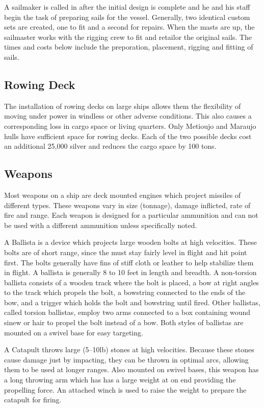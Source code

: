 A sailmaker is called in after the initial design is complete and he and his staff begin the task of preparing sails for the vessel. Generally, two identical custom sets are created, one to fit and a second for repairs. When the masts are up, the sailmaster works with the rigging crew to fit and retailor the original sails. The times and costs below include the preporation, placement, rigging and fitting of sails.


\subsection{Rowing Deck}
The installation of rowing decks on large ships allows them the flexibility of moving under power in windless or other adverse conditions. This also causes a corresponding loss in cargo space or living quarters. Only Metioujo and Maraujo hulls have sufficient space for rowing decks. Each of the two possible decks cost an additional 25,000 silver and reduces the cargo space by 100 tons.
\subsection{Weapons}
Most weapons on a ship are deck mounted engines which project missiles of different types. These weapons vary in size (tonnage), damage inflicted, rate of fire and range. Each weapon is designed for a particular ammunition and can not be used with a different ammunition unless specifically noted.

A Ballista is a device which projects large wooden bolts at high velocities. These bolts are of short range, since the must stay fairly level in flight and hit point first. The bolts generally have fins of stiff cloth or leather to help stabilize them in flight. A ballista is generally 8 to 10 feet in length and breadth. A non-torsion ballista consists of a wooden track where the bolt is placed, a bow at right angles to the track which propels the bolt, a bowstring connected to the ends of the bow, and a trigger which holds the bolt and bowstring until fired. Other ballistas, called torsion ballistas, employ two arms connected to a box containing wound sinew or hair to propel the bolt instead of a bow. Both styles of ballistas are mounted on a swivel base for easy targeting.

A Catapult throws large (5–10lb) stones at high velocities. Because these stones cause damage just by impacting, they can be thrown in optimal arcs, allowing them to be used at longer ranges. Also mounted on swivel bases,
this weapon has a long throwing arm which has has a large weight at on end providing the propelling force. An attached winch is used to raise the weight to prepare the catapult for firing.

